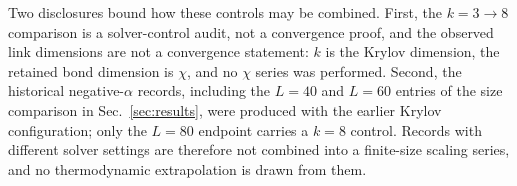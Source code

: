 Two disclosures bound how these controls may be combined.
First, the $k=3\rightarrow8$ comparison is a solver-control audit, not a convergence proof, and the observed link dimensions are not a convergence statement: $k$ is the Krylov dimension, the retained bond dimension is $\chi$, and no $\chi$ series was performed.
Second, the historical negative-$\alpha$ records, including the $L=40$ and $L=60$ entries of the size comparison in Sec.~\ref{sec:results}, were produced with the earlier Krylov configuration; only the $L=80$ endpoint carries a $k=8$ control.
Records with different solver settings are therefore not combined into a finite-size scaling series, and no thermodynamic extrapolation is drawn from them.
